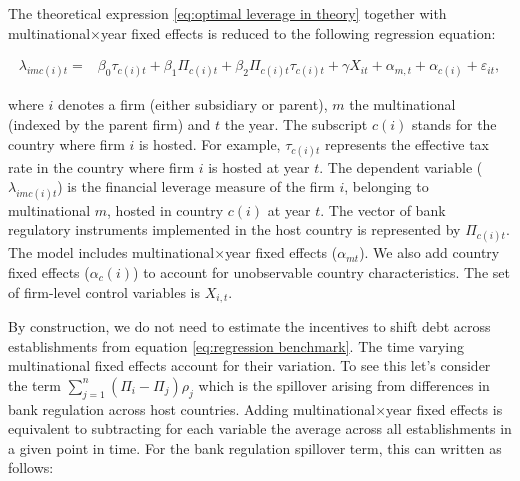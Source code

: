 \documentclass[12pt]{article}
\begin{document}
    The theoretical expression \ref{eq:optimal leverage in theory} together with multinational$\times$year fixed effects is reduced to the following regression equation:  
    
    \begin{equation}
    \begin{aligned}
    \lambda_{imc(i)t}=&\beta_0\tau_{c(i)t}+\beta_1\Pi_{c(i)t}+\beta_2\Pi_{c(i)t}\tau_{c(i)t}+\gamma X_{it}+\alpha_{m,t}+\alpha_{c(i)}+\varepsilon_{it},
    \label{eq:regression benchmark}
    \end{aligned}
    \end{equation}
    
    where $i$ denotes a firm (either subsidiary or parent), $m$ the multinational (indexed by the parent firm) and $t$ the year. The subscript $c(i)$ stands for the country where firm $i$ is hosted. For example, $\tau_{c(i)t}$ represents the effective tax rate in the country where firm $i$ is hosted at year $t$. The dependent variable ($\lambda_{imc(i)t}$) is the financial leverage measure of the firm $i$, belonging to multinational $m$, hosted in country $c(i)$ at year $t$. The vector of bank regulatory instruments implemented in the host country is represented by $\Pi_{c(i)t}$. The model includes multinational$\times$year fixed effects ($\alpha_{mt}$). We also add country fixed effects ($\alpha_c(i)$) to account for unobservable country characteristics. The set of firm-level control variables is $X_{i,t}$. 
    
    By construction, we do not need to estimate the incentives to shift debt across establishments from equation \ref{eq:regression benchmark}. The time varying multinational fixed effects account for their variation. To see this let's consider the term $\sum_{j=1}^{n}(\Pi_i-\Pi_j)\rho_j$ which is the spillover arising from differences in bank regulation across host countries. Adding multinational$\times$year fixed effects is equivalent to subtracting for each variable the average across all establishments in a given point in time. For the bank regulation spillover term, this can written as follows:
    
\end{document}
